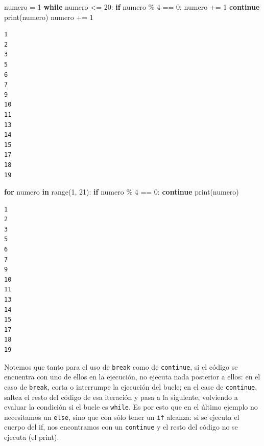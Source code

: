 \documentclass[
  letterpaper,
  DIV=11,
  numbers=noendperiod]{scrreprt}
\newenvironment{Shaded}{\begin{snugshade}}{\end{snugshade}}
\newcommand{\BuiltInTok}[1]{\textcolor[rgb]{0.00,0.23,0.31}{#1}}
\newcommand{\ControlFlowTok}[1]{\textcolor[rgb]{0.00,0.23,0.31}{\textbf{#1}}}
\newcommand{\DecValTok}[1]{\textcolor[rgb]{0.68,0.00,0.00}{#1}}
\newcommand{\KeywordTok}[1]{\textcolor[rgb]{0.00,0.23,0.31}{\textbf{#1}}}
\newcommand{\NormalTok}[1]{\textcolor[rgb]{0.00,0.23,0.31}{#1}}
\newcommand{\OperatorTok}[1]{\textcolor[rgb]{0.37,0.37,0.37}{#1}}
\begin{document}
\begin{Shaded}
\begin{Highlighting}[]
\NormalTok{numero }\OperatorTok{=} \DecValTok{1}
\ControlFlowTok{while}\NormalTok{ numero }\OperatorTok{\textless{}=} \DecValTok{20}\NormalTok{:}
  \ControlFlowTok{if}\NormalTok{ numero }\OperatorTok{\%} \DecValTok{4} \OperatorTok{==} \DecValTok{0}\NormalTok{:}
\NormalTok{      numero }\OperatorTok{+=} \DecValTok{1}
      \ControlFlowTok{continue}
  \BuiltInTok{print}\NormalTok{(numero)}
\NormalTok{  numero }\OperatorTok{+=} \DecValTok{1}
\end{Highlighting}
\end{Shaded}

\begin{verbatim}
1
2
3
5
6
7
9
10
11
13
14
15
17
18
19
\end{verbatim}

\begin{Shaded}
\begin{Highlighting}[]
\ControlFlowTok{for}\NormalTok{ numero }\KeywordTok{in} \BuiltInTok{range}\NormalTok{(}\DecValTok{1}\NormalTok{, }\DecValTok{21}\NormalTok{):}
  \ControlFlowTok{if}\NormalTok{ numero }\OperatorTok{\%} \DecValTok{4} \OperatorTok{==} \DecValTok{0}\NormalTok{:}
      \ControlFlowTok{continue}
  \BuiltInTok{print}\NormalTok{(numero)}
\end{Highlighting}
\end{Shaded}

\begin{verbatim}
1
2
3
5
6
7
9
10
11
13
14
15
17
18
19
\end{verbatim}

\begin{tcolorbox}[enhanced jigsaw, arc=.35mm, toptitle=1mm, colframe=quarto-callout-note-color-frame, bottomtitle=1mm, opacitybacktitle=0.6, colbacktitle=quarto-callout-note-color!10!white, leftrule=.75mm, coltitle=black, toprule=.15mm, titlerule=0mm, title=\textcolor{quarto-callout-note-color}{\faInfo}\hspace{0.5em}{Note}, bottomrule=.15mm, rightrule=.15mm, colback=white, breakable, opacityback=0, left=2mm]

Notemos que tanto para el uso de \texttt{break} como de
\texttt{continue}, si el código se encuentra con uno de ellos en la
ejecución, no ejecuta nada posterior a ellos: en el caso de
\texttt{break}, corta o interrumpe la ejecución del bucle; en el case de
\texttt{continue}, saltea el resto del código de esa iteración y pasa a
la siguiente, volviendo a evaluar la condición si el bucle es
\texttt{while}. Es por esto que en el último ejemplo no necesitamos un
\texttt{else}, sino que con sólo tener un \texttt{if} alcanza: si se
ejecuta el cuerpo del if, nos encontramos con un \texttt{continue} y el
resto del código no se ejecuta (el print).

\end{tcolorbox}
\end{document}

